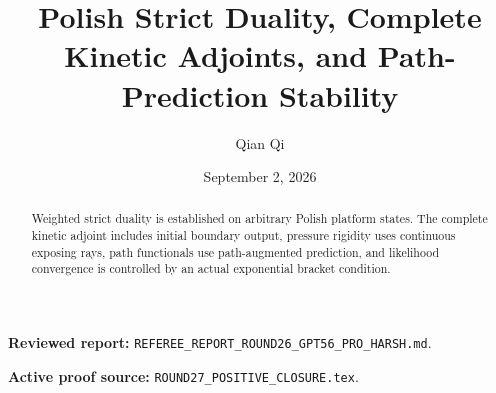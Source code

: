 \documentclass[11pt,reqno]{amsart}
\title[C2 Round 27 revision]{Polish Strict Duality, Complete Kinetic Adjoints, and Path-Prediction Stability}
\author{Qian Qi}
\date{September 2, 2026}
\begin{document}
\begin{abstract}Weighted strict duality is established on arbitrary Polish platform states. The complete kinetic adjoint includes initial boundary output, pressure rigidity uses continuous exposing rays, path functionals use path-augmented prediction, and likelihood convergence is controlled by an actual exponential bracket condition.\end{abstract}
\maketitle
\noindent\textbf{Reviewed report:} \texttt{REFEREE\_REPORT\_ROUND26\_GPT56\_PRO\_HARSH.md}.\par
\noindent\textbf{Active proof source:} \texttt{ROUND27\_POSITIVE\_CLOSURE.tex}.\par

\end{document}
